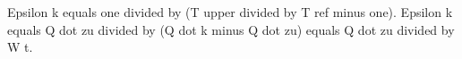 Epsilon k equals one divided by (T upper divided by T ref minus one).  
Epsilon k equals Q dot zu divided by (Q dot k minus Q dot zu) equals Q dot zu divided by W t.